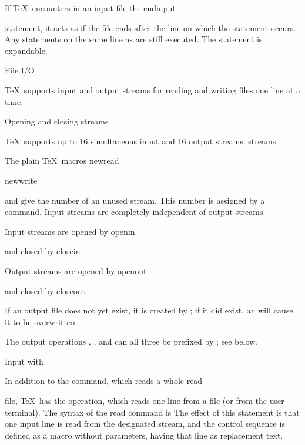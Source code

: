 If \TeX\ encounters in an input file the
\csterm endinput\par
{} statement, it acts as if the file
ends after the line on which the statement occurs.
Any statements on the same line as  are
still executed.
The  statement is expandable.

\point File I{/}O

\TeX\ supports input and output streams for reading and writing
\altt
files one line at a time.

\spoint Opening and closing streams

\TeX\ supports up to 16 simultaneous input and 16 output streams. 
\term streams\par
The plain \TeX\ macros
\csterm newread\par\csterm newwrite\par
{} and  give the number of an unused
stream. This number is assigned by a  command. 
Input streams are completely independent of output
streams. 

Input streams are opened by
\csterm openin\par
\disp{}\dispstop
and closed by 
\csterm closein\par
\disp{}\dispstop

Output streams are opened by
\csterm openout\par
\disp{}\dispstop
and closed by
\csterm closeout\par
\disp{}\dispstop

If an output file does not yet exist, it is created
by ; if it did exist, an  will
cause it to be overwritten.

The output operations , ,
and  can all three be prefixed by ;
see below.

\spoint Input with 

In addition to the  command, which reads a whole
\csterm read\par
file, \TeX\ has the  operation, which
reads one line from a file (or from the user terminal).
The syntax of the read command is
  \disp{}\dispstop
The effect of this statement is that one input line
is read from the designated stream, and the control
sequence is defined as a macro without parameters, having
that line as replacement text.

